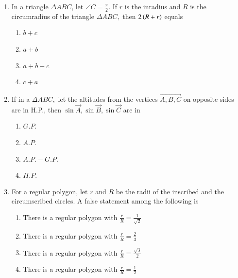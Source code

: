 \begin{enumerate}[label=\thesubsection.\arabic*,ref=\thesubsection.\theenumi]
\item In a triangle $\Delta{ABC}$, let $\angle{C}=\frac{\pi}{2}.$ If $r$ is the inradius and $R$ is the circumradius of the triangle $\Delta{ABC},$ then $2\left(R+r\right)$ equals \hfill{}
\begin{multicols}{4}
\begin{enumerate}
        \item $b+c$                    
        \item $a+b$ 
        \item $a+b+c$ 
        \item $c+a$
\end{enumerate}
\end{multicols} 

\item If in a $\Delta ABC,$ let the altitudes from the vertices $\vec{A,B,C}$ on opposite sides are in H.P., then $\sin \vec{A},\sin \vec{B},\sin \vec{C}$ are in \hfill{}
\begin{multicols}{4}
\begin{enumerate}
        \item $G.P.$                    
        \item $A.P.$ 
        \item $A.P.-G.P.$ 
        \item $H.P.$
\end{enumerate}
\end{multicols} 


\item For a regular polygon, let $r$ and $R$ be the radii of the inscribed and the circumscribed circles. A false statement among the following is \hfill{}
\begin{enumerate}
        \item There is a regular polygon with $\frac{r}{R}=\frac{1}{\sqrt{2}}$                    
        \item There is a regular polygon with $\frac{r}{R}=\frac{2}{3}$ 
        \item There is a regular polygon with $\frac{r}{R}=\frac{\sqrt{3}}{2}$ 
        \item There is a regular polygon with $\frac{r}{R}=\frac{1}{2}$
\end{enumerate}


\end{enumerate}
